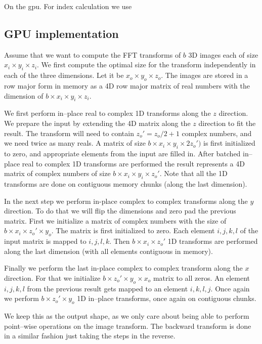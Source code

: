 \documentclass[conference]{IEEEtran}
\begin{document}
On the gpu.  For index calculation we use~\cite{warren2013hacker}

\subsection{GPU implementation}

Assume that we want to compute the FFT transforms of $b$ 3D images
each of size $x_i \times y_i \times z_i$.  We first compute the
optimal size for the transform independently in each of the three
dimensions.  Let it be $x_o \times y_o \times z_o$.  The images are
stored in a row major form in memory as a 4D row major matrix of real
numbers with the dimension of $b \times x_i \times y_i \times z_i$.

We first perform in--place real to complex 1D transforms along the $z$
direction. We prepare the input by extending the 4D matrix along the
$z$ direction to fit the result.  The transform will need to contain
$z_o' = z_o / 2 + 1$ complex numbers, and we need twice as many reals.
A matrix of size $b \times x_i \times y_i \times 2z_o')$ is first
initialized to zero, and appropriate elements from the input are
filled in.  After batched in--place real to complex 1D transforms are
performed the result represents a 4D matrix of complex numbers of size
$b \times x_i \times y_i \times z_o'$.  Note that all the 1D
transforms are done on contiguous memory chunks (along the last
dimension).

In the next step we perform in-place complex to complex transforms
along the $y$ direction.  To do that we will flip the dimensions and
zero pad the previous matrix.  First we initialize a matrix of complex
numbers with the size of $b \times x_i \times z_o' \times y_o$.  The
matrix is first initialized to zero.  Each element $i,j,k,l$ of the
input matrix is mapped to $i,j,l,k$.  Then $b \times x_i \times z_o'$
1D transforms are performed along the last dimension (with all
elements contiguous in memory).

Finally we perform the last in-place complex to complex transform
along the $x$ direction.  For that we initialize $b \times z_o' \times
y_o \times x_o$ matrix to all zeros.  An element $i,j,k,l$ from the
previous result gets mapped to an element $i,k,l,j$.  Once again we
perform $b \times z_o' \times y_o$ 1D in--place transforms, once again
on contiguous chunks.

We keep this as the output shape, as we only care about being able to
perform point--wise operations on the image transform.  The backward
transform is done in a similar fashion just taking the steps in the
reverse.
\end{document}
